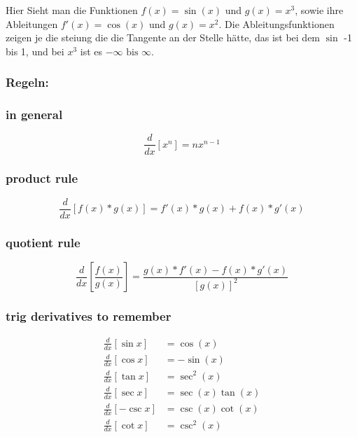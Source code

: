 \documentclass{book}
\begin{document}
\clearpage


Hier Sieht man die Funktionen $f(x)=\sin(x)$ und $g(x)=x^3$, sowie ihre
Ableitungen $f'(x)=\cos(x)$ und $g(x)=x^2$.
Die Ableitungsfunktionen zeigen je die steiung die die Tangente an der Stelle
hätte, das ist bei dem $\sin$ -1 bis 1, und bei $x^3$ ist es $-\infty\text{ bis }\infty$.

\subsubsection{Regeln:}
\subsubsection{in general}
\[\frac{d}{dx}[x^n] = nx^{n-1}\]

\subsubsection{product rule}
\[\frac{d}{dx}\left[f(x)*g(x)\right]=f'(x)*g(x)+f(x)*g'(x)\]

\subsubsection{quotient rule}
\[\frac{d}{dx} \left[\frac{f(x)}{g(x)}\right]=
\frac{g(x)*f'(x)-f(x)*g'(x)}{[g(x)]^2}\]

\subsubsection{trig derivatives to remember}
\begin{align*}
    \frac{d}{dx}[\sin x]&=\cos (x)\\
    \frac{d}{dx}[\cos x]&=-\sin(x)\\
    \frac{d}{dx}[\tan x]&=\sec^2 (x)\\
    \frac{d}{dx}[\sec x]&=\sec(x)\tan(x)\\
    \frac{d}{dx}[-\csc x]&=\csc(x)\cot(x)\\
    \frac{d}{dx}[\cot x]&=\csc^2(x)\\
\end{align*}
\end{document}
